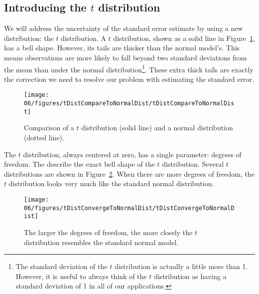 


\subsection{Introducing the $t$ distribution}

We will address the uncertainty of the standard error estimate by using a new distribution: the $t$ distribution. A $t$ distribution, shown as a solid line in Figure~\ref{tDistCompareToNormalDist}, has a bell shape. However, its tails are thicker than the normal model's. 
This means observations are more likely to fall beyond two standard deviations from the mean than under the normal distribution\footnote{The standard deviation of the $t$ distribution is actually a little more than 1. However, it is useful to always think of the $t$ distribution as having a standard deviation of 1 in all of our applications.}.
These extra thick tails are exactly the correction we need to resolve our problem with estimating the standard error.
\begin{figure}
\centering
\texttt{[image: 06/figures/tDistCompareToNormalDist/tDistCompareToNormalDist]}
\caption{Comparison of a $t$ distribution (solid line) and a normal distribution (dotted line).}
\label{tDistCompareToNormalDist}
\end{figure}

The $t$ distribution, always centered at zero, has a single parameter: degrees of freedom. The  describe the exact bell shape of the $t$ distribution. Several $t$ distributions are shown in Figure~\ref{tDistConvergeToNormalDist}. When there are more degrees of freedom, the $t$ distribution looks very much like the standard normal distribution.
\begin{figure}
\centering
\texttt{[image: 06/figures/tDistConvergeToNormalDist/tDistConvergeToNormalDist]}
\caption{The larger the degrees of freedom, the more closely the $t$ distribution resembles the standard normal model.}\vspace{-2mm}
\label{tDistConvergeToNormalDist}
\end{figure}

